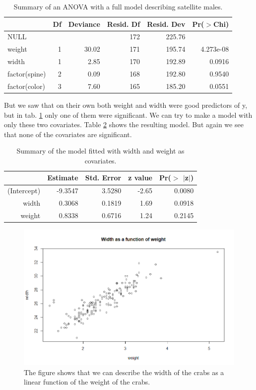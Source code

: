 \documentclass[a4paper,norsk, 10pt]{article}
\begin{document}
\begin{table}[!htb]
\centering
\begin{tabular}{lrrrrr}
  \hline
 & Df & Deviance & Resid. Df & Resid. Dev & Pr($>$Chi) \\ 
  \hline
NULL &  &  & 172 & 225.76 &  \\ 
  weight & 1 & 30.02 & 171 & 195.74 & 4.273e-08 \\ 
  width & 1 & 2.85 & 170 & 192.89 & 0.0916 \\ 
  factor(spine) & 2 & 0.09 & 168 & 192.80 & 0.9540 \\ 
  factor(color) & 3 & 7.60 & 165 & 185.20 & 0.0551 \\ 
   \hline
\end{tabular}
\caption{Summary of an ANOVA with a full model describing satellite males.}\label{tab:crabs_anova}
\end{table}




But we saw that on their own both weight and width were good predictors of y, but in tab. \ref{tab:crabs_anova} only one of them were significant. We can try to make a model with only these two covariates. Table \ref{tab:crabs_width_weight} shows the resulting model. But again we see that none of the covariates are significant. 

\begin{table}[!htb]
\centering
\begin{tabular}{rrrrr}
  \hline
 & Estimate & Std. Error & z value & Pr($>$ $|$z$|$) \\ 
  \hline
(Intercept) & -9.3547 & 3.5280 & -2.65 & 0.0080 \\ 
  width & 0.3068 & 0.1819 & 1.69 & 0.0918 \\ 
  weight & 0.8338 & 0.6716 & 1.24 & 0.2145 \\ 
   \hline
\end{tabular}
\caption{Summary of the model fitted with width and weight as covariates.}\label{tab:crabs_width_weight}
\end{table}

\begin{figure}[!htb]
\centering
\includegraphics[scale=0.5]{crabs_width_weight}
\caption{The figure shows that we can describe the width of the crabs as a linear function of the weight of the crabs.}\label{fig:crabs_width_weight}
\end{figure}
\end{document}
